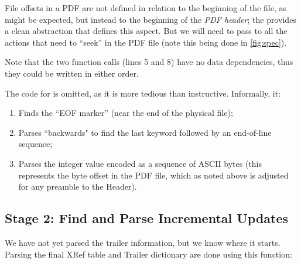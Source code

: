 File offsets in a PDF are not defined in relation to the beginning of
the file, as might be expected, but instead to the beginning of the
\emph{PDF header};
%
the  provides a clean abstraction that defines this
aspect.
%
But we will need to pass  to all the actions that need to
``seek'' in the PDF file (note this being done in \cref{fig:spec}).

Note that the two function calls (lines 5 and 8) have no data
dependencies, thus they could be written in either order.

The code for  is
omitted, as it is more tedious than instructive.
%
Informally, it:
\begin{enumerate}
\item Finds the ``EOF marker''  (near the end of the physical
  file);
\item Parses ``backwards" to find the last  keyword
  followed by an end-of-line sequence;
\item Parses the integer value encoded as a sequence of ASCII bytes
  (this represents the byte offset in the PDF file, which as noted
  above is adjusted for any preamble to the Header).
\end{enumerate}

\subsection{Stage 2: Find and Parse Incremental Updates}
\label{sec:stage-2}

We have not yet parsed the trailer information, but we know where
it starts.  Parsing the final XRef table and Trailer dictionary are
done using this function:

\lstset{numbers=right}
\lstset{numbers=none}

